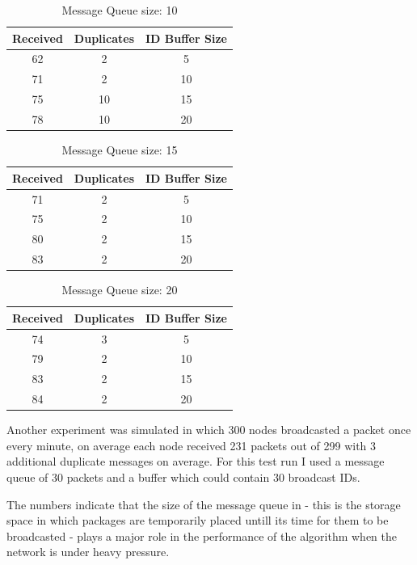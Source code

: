 \documentclass[a4paper]{article}
\begin{document}
\begin{table}[H]
\centering
\begin{tabular}{|c|c|c|}
\hline
Received&	Duplicates& 	ID Buffer Size \\
\hline

62 &	2	 &	5 \\
\hline

71 &	2	&	10 \\
\hline

75 &	10 &	15 \\
\hline

78 &	10 &	20 \\
\hline
\end{tabular}
\label{f2}
\caption{Message Queue size: 10}
\end{table}

\begin{table}[H]
\centering
\begin{tabular}{|c|c|c|}
\hline
Received&	Duplicates& 	ID Buffer Size \\
\hline
71&2&5 \\
\hline
75&2&10 \\
\hline
80&2&15 \\
\hline
83&2&20 \\
\hline
\end{tabular}
\label{f3}
\caption{Message Queue size: 15}
\end{table}


\begin{table}[H]
\centering
\begin{tabular}{|c|c|c|}
\hline
Received&	Duplicates& 	ID Buffer Size \\
\hline
74&3&5 \\
\hline
79&2&10 \\
\hline
83&2&15 \\
\hline
84&2&20 \\
\hline
\end{tabular}
\label{f4}
\caption{Message Queue size: 20}
\end{table}

Another experiment was simulated in which 300 nodes broadcasted a packet once every minute, on average each node
received 231 packets out of 299 with 3 additional duplicate messages on average. For this test run I used a
message queue of 30 packets and a buffer which could contain 30 broadcast IDs.

The numbers indicate that the size of the message queue in - this is the storage space in which packages 
are temporarily placed untill its time for them to be broadcasted - plays a major role in the performance
of the algorithm when the network is under heavy pressure.
\end{document}
